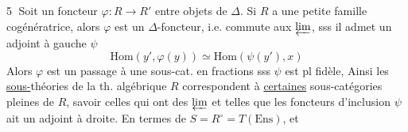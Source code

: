\textcircled{5} Soit un foncteur $\varphi:R\longrightarrow R'$ entre objets de $\Delta$. Si $R$ a une petite famille cogénératrice, alors $\varphi$ est un $\Delta$-foncteur, i.e. commute aux $\varprojlim$, sss il admet un adjoint à gauche $\psi$
\[
\mathrm{Hom}(y',\varphi(y))\simeq\mathrm{Hom}(\psi(y'),x)
\]
Alors $\varphi$ est un passage à une sous-cat.  en fractions sss  $\psi$ est pl fidèle,  Ainsi les \uline{sous-}théories  de la th. algébrique $R$ correspondent  à \uline{certaines} sous-catégories pleines de $R$, savoir celles qui ont des $\varprojlim$ et telles que les foncteurs d'inclusion $\psi$ ait un adjoint à  droite. En termes de $S=R^\circ=T(\mathrm{Ens})$, et  
